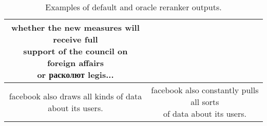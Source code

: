 \begin{table}
\begin{tabular}{||c|c||}
	\parbox{7cm}{\vspace{.5\baselineskip} whether the new measures will receive full\\support of the council on foreign affairs\\or расколют legis...\vspace{.5\baselineskip}}\\
	\hline
	\parbox{7cm}{\vspace{.5\baselineskip} facebook also draws all kinds of data\\about its users. \vspace{.5\baselineskip}}&
	\parbox{7cm}{\vspace{.5\baselineskip} facebook also constantly pulls all sorts\\of data about its users.\vspace{.5\baselineskip}}\\
	\hline
	\end{tabular}
	\caption{Examples of default and oracle reranker outputs.}\label{translation_compare}
\end{table}
